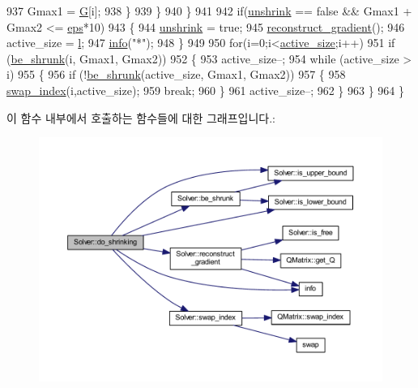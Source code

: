 \begin{DoxyCode}
937                     Gmax1 = \hyperlink{class_solver_ad8ab27068f2e045591970aae1201afe9}{G}[i];
938             \}
939         \}
940     \}
941 
942     \textcolor{keywordflow}{if}(\hyperlink{class_solver_a62ded1c184aeb28f8dee04eb4a10530a}{unshrink} == \textcolor{keyword}{false} && Gmax1 + Gmax2 <= \hyperlink{class_solver_a718333cc2c1d40abf9c292a788cba1e5}{eps}*10) 
943     \{
944         \hyperlink{class_solver_a62ded1c184aeb28f8dee04eb4a10530a}{unshrink} = \textcolor{keyword}{true};
945         \hyperlink{class_solver_a7e34992ede606a336606ae54f6e963e6}{reconstruct\_gradient}();
946         active\_size = \hyperlink{class_solver_a88832d45b6de977b1cbb2afd4c0e494c}{l};
947         \hyperlink{svm_8cpp_ab834c069665121a3467868539fde9101}{info}(\textcolor{stringliteral}{"*"});
948     \}
949 
950     \textcolor{keywordflow}{for}(i=0;i<\hyperlink{class_solver_a06ba1b87b3749cc545e573151b7beca0}{active\_size};i++)
951         \textcolor{keywordflow}{if} (\hyperlink{class_solver_a7f4c3abc7cad2864d85bbe41e4d7da03}{be\_shrunk}(i, Gmax1, Gmax2))
952         \{
953             active\_size--;
954             \textcolor{keywordflow}{while} (active\_size > i)
955             \{
956                 \textcolor{keywordflow}{if} (!\hyperlink{class_solver_a7f4c3abc7cad2864d85bbe41e4d7da03}{be\_shrunk}(active\_size, Gmax1, Gmax2))
957                 \{
958                     \hyperlink{class_solver_a043f498c1dda0122859d03f9cd07dc08}{swap\_index}(i,active\_size);
959                     \textcolor{keywordflow}{break};
960                 \}
961                 active\_size--;
962             \}
963         \}
964 \}
\end{DoxyCode}


이 함수 내부에서 호출하는 함수들에 대한 그래프입니다.\+:
\nopagebreak
\begin{figure}[H]
\begin{center}
\leavevmode
\includegraphics[width=350pt]{class_solver_ad3f6665a1ca590e56b3d51f8ddcc347c_cgraph}
\end{center}
\end{figure}




